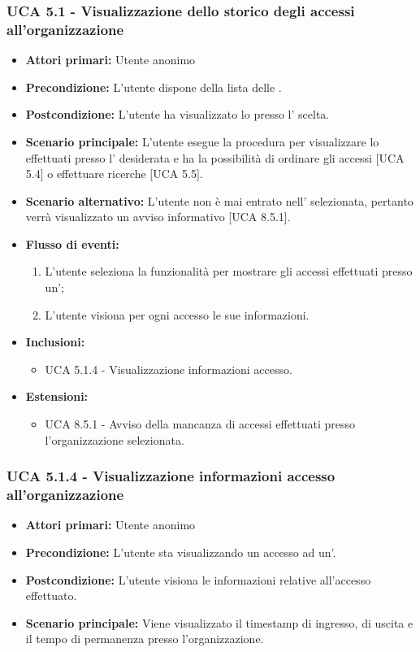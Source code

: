 \subsubsection{UCA 5.1 - Visualizzazione dello storico degli accessi all'organizzazione}
\begin{itemize}
    \item \textbf{Attori primari:} Utente anonimo
    \item \textbf{Precondizione:} L'utente dispone della lista delle .
    \item \textbf{Postcondizione:} L'utente ha visualizzato lo  presso l' scelta.
    \item \textbf{Scenario principale:} L'utente esegue la procedura per visualizzare lo  effettuati presso l' desiderata e ha la possibilità di ordinare gli accessi [UCA 5.4] o effettuare ricerche [UCA 5.5].
    \item \textbf{Scenario alternativo:} L'utente non è mai entrato nell' selezionata, pertanto verrà visualizzato un avviso informativo [UCA 8.5.1].
    \item \textbf{Flusso di eventi:}
    \begin{enumerate}
        \item L'utente seleziona la funzionalità per mostrare gli accessi effettuati presso un';
        \item L'utente visiona per ogni accesso le sue informazioni.
    \end{enumerate}
    \item \textbf{Inclusioni:}
    \begin{itemize}
        \item UCA 5.1.4 - Visualizzazione informazioni accesso.
    \end{itemize}
    \item \textbf{Estensioni:}
    \begin{itemize}
        \item UCA 8.5.1 - Avviso della mancanza di accessi effettuati presso l'organizzazione selezionata.
    \end{itemize}
\end{itemize}

\subsubsection{UCA 5.1.4 - Visualizzazione informazioni accesso all'organizzazione}
\begin{itemize}
	\item \textbf{Attori primari:} Utente anonimo
	\item \textbf{Precondizione:} L'utente sta visualizzando un accesso ad un'.
	\item \textbf{Postcondizione:} L'utente visiona le informazioni relative all'accesso effettuato.
	\item \textbf{Scenario principale:} Viene visualizzato il timestamp di ingresso, di uscita e il tempo di permanenza presso l'organizzazione.
\end{itemize}

